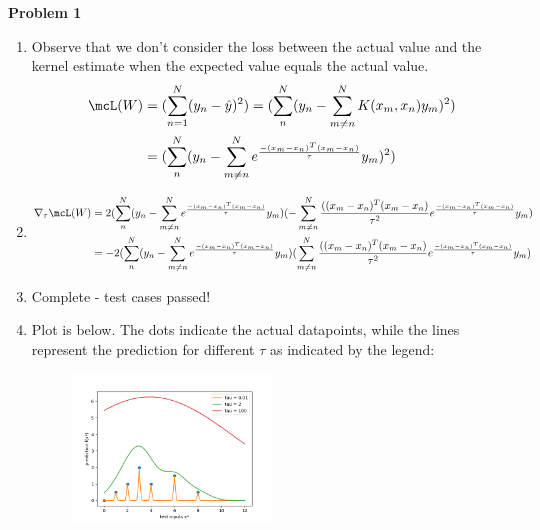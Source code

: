 \documentclass[submit]{harvardml}
\begin{document}
\newpage
\textbf{Problem 1}
\begin{enumerate}
    \item Observe that we don't consider the loss between the actual value and the kernel estimate when the expected value equals the actual value.
    \begin{align}
        \mcL(W) &= (\sum_{n=1}^N (y_n - \hat{y})^2)
        = (\sum_{n}^N (y_n - \sum_{m\neq n}^N K(x_m, x_n) y_m)^2) \\
        &= (\sum_{n}^N (y_n - \sum_{m\neq n}^N e^\frac{-(x_m - x_n)^T(x_m - x_n)}{\tau} y_m)^2) 
    \end{align}
    
    \item  
    \begin{align}
        \nabla_\tau \mcL(W) &= 2(\sum_{n}^N (y_n - \sum_{m\neq n}^N e^\frac{-(x_m - x_n)^T(x_m - x_n)}{\tau} y_m)(-\sum_{m\neq n}^N \frac{((x_m - x_n)^T(x_m - x_n)}{\tau^2} e^\frac{-(x_m - x_n)^T(x_m - x_n)}{\tau} y_m) \\
        &= -2(\sum_{n}^N (y_n - \sum_{m\neq n}^N e^\frac{-(x_m - x_n)^T(x_m - x_n)}{\tau} y_m)(\sum_{m\neq n}^N \frac{((x_m - x_n)^T(x_m - x_n)}{\tau^2} e^\frac{-(x_m - x_n)^T(x_m - x_n)}{\tau} y_m)
    \end{align}

    
    \item Complete - test cases passed!
    
    
    \item Plot is below. The dots indicate the actual datapoints, while the lines represent the prediction for different $\tau$ as indicated by the legend: 
    \begin{figure} [h!]
        \centering
        \includegraphics[width=0.5\textwidth]{HW1/ps1-p1.png}
    \end{figure}
    

\end{enumerate}
\end{document}
